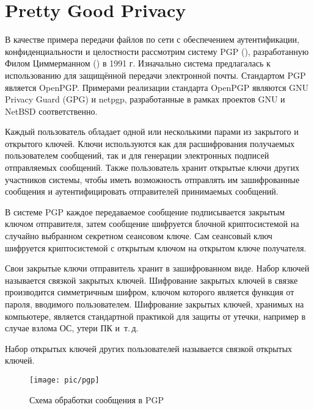 \section{Pretty Good Privacy}

В качестве примера передачи файлов по сети с обеспечением аутентификации, конфиденциальности и целостности рассмотрим систему PGP (), разработанную Филом Циммерманном () в 1991 г. Изначально система предлагалась к использованию для защищённой передачи электронной почты. Стандартом PGP является OpenPGP. Примерами реализации стандарта OpenPGP являются GNU Privacy Guard (GPG) и netpgp, разработанные в рамках проектов GNU и NetBSD соответственно.

Каждый пользователь обладает одной или несколькими парами из закрытого и открытого ключей. Ключи используются как для расшифрования получаемых пользователем сообщений, так и для генерации электронных подписей отправляемых сообщений. Также пользователь хранит открытые ключи других участников системы, чтобы иметь возможность отправлять им зашифрованные сообщения и аутентифицировать отправителей принимаемых сообщений.

В системе PGP каждое передаваемое сообщение подписывается закрытым ключом отправителя, затем сообщение шифруется блочной криптосистемой на случайно выбранном секретном сеансовом ключе. Сам сеансовый ключ шифруется криптосистемой с открытым ключом на открытом ключе получателя.

Свои закрытые ключи отправитель хранит в зашифрованном виде. Набор ключей называется связкой закрытых ключей. Шифрование закрытых ключей в связке производится симметричным шифром, ключом которого является функция от пароля, вводимого пользователем. Шифрование закрытых ключей, хранимых на компьютере, является стандартной практикой для защиты от утечки, например в случае взлома ОС, утери ПК и~т.\,д.

Набор открытых ключей других пользователей называется связкой открытых ключей.

\begin{figure}[!ht]
	\centering
	\texttt{[image: pic/pgp]}
	\caption{Схема обработки сообщения в PGP\label{fig:pgp}}
\end{figure}

